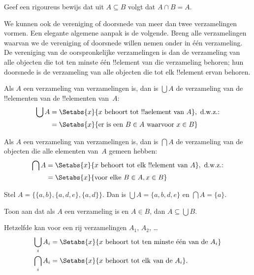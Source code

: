 \documentclass[openany]{memoir}
\begin{document}
\begin{prob}
Geef een rigoureus bewijs dat uit $A \subseteq B$ volgt dat $A \cap B = A$.
\end{prob}

\begin{explain}
We kunnen ook de vereniging of doorsnede van meer dan twee verzamelingen
vormen. Een elegante algemene aanpak is de volgende. Breng alle verzamelingen
waarvan we de vereniging of doorsnede willen nemen onder in één verzameling.
De vereniging van de oorspronkelijke verzamelingen is dan de verzameling van
alle objecten die tot ten minste één !!{element} van die verzameling behoren;
hun doorsnede is de verzameling van alle objecten die tot elk !!{element}
ervan behoren.
\end{explain}

\begin{defn}
Als $A$ een verzameling van verzamelingen is, dan is $\bigcup A$ de verzameling
van de !!{element}en van de !!{element}en van~$A$:
\begin{align*}
\bigcup A & = \Setabs{x}{x \text{ behoort tot !!a{element} van } A},
\text{ d.w.z.:}\\
& = \Setabs{x}{\text{er is een } B \in A
  \text{ waarvoor } x \in B}
\end{align*}
\end{defn}

\begin{defn}
Als $A$ een verzameling van verzamelingen is, dan is $\bigcap A$ de verzameling
van de objecten die alle elementen van~$A$ gemeen hebben:
\begin{align*}
\bigcap A & = \Setabs{x}{x \text{ behoort tot elk !!{element} van } A},
\text{ d.w.z.:}\\
 & = \Setabs{x}{\text{voor elke } B \in A, x \in B}
\end{align*}
\end{defn}

\begin{ex}
Stel $A = \{ \{ a, b \}, \{ a, d, e \}, \{ a, d \} \}$.
Dan is $\bigcup A = \{ a, b, d, e \}$ en $\bigcap A = \{ a \}$.
\end{ex}
\begin{prob}
	Toon aan dat als $A$ een verzameling is en $A \in B$, dan
	$A \subseteq \bigcup B$.
\end{prob}

Hetzelfde kan voor een rij verzamelingen $A_1$, $A_2$, \dots
\begin{align*}
\bigcup_i A_i & = \Setabs{x}{x \text{ behoort tot ten minste één van de } A_i}\\
\bigcap_i A_i & = \Setabs{x}{x \text{ behoort tot elk van de } A_i}.
\end{align*}
\end{document}
